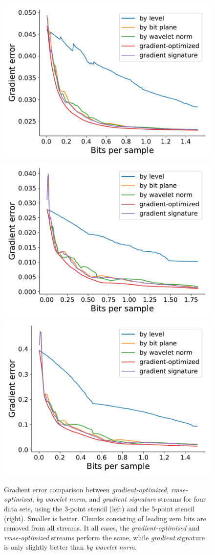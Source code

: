 \begin{figure}
	{\includegraphics[width=0.48\linewidth]{img/gradient/5points/gradient-optimized-pressure.pdf}}
	{\includegraphics[width=0.48\linewidth]{img/gradient/5points/gradient-optimized-marschner-lobb.pdf}}
	{\includegraphics[width=0.48\linewidth]{img/gradient/5points/gradient-optimized-velocityz.pdf}}
	\caption{Gradient error comparison between \emph{gradient-optimized}, \emph{rmse-optimized},
	\emph{by wavelet norm}, and \emph{gradient signature} streams for four data sets, using the
	3-point stencil (left) and the 5-point stencil (right). Smaller is better. Chunks consisting of
	leading zero bits are removed from all streams. It all cases, the \emph{gradient-optimized} and
	\emph{rmse-optimized} streams perform the same, while \emph{gradient} signature is only slightly
	better than \emph{by wavelet norm}.}
	\label{fig:gradient-error-comparison}
\end{figure}

